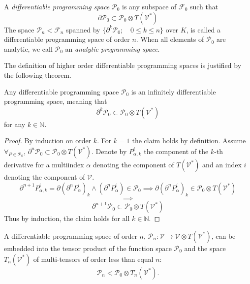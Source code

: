 \documentclass[11pt]{article}
\newcommand{\VV}{\mathcal{V}}
\newcommand{\F}{\mathcal{F}}
\newcommand{\dP}{\mathcal{P}}
\newcommand{\D}{\partial}
\begin{document}
 
 \begin{definition}\label{def:dP}
 	A \emph{differentiable programming space} $\dP_0$ is any subspace of $\F_0$ such that
 	\begin{equation}\label{eq:P}
 	\D\dP_0\subset\dP_0\otimes T(\VV^*)
\end{equation}
The space $\dP_n<\F_n$ spanned by $\{\D^k\dP_0;\quad 0\le k\le n\}$ over $K$, is
called a differentiable programming space of order $n$. When all elements of
$\dP_0$ are analytic, we call $\dP_0$ an \emph{analytic programming space}. 
 \end{definition}
The definition of higher order differentiable programming spaces is justified by the following theorem. 
\begin{theorem}\label{izr:P}
	Any differentiable programming space $\dP_0$ is an
  infinitely differentiable programming space, meaning that
	\begin{equation}\label{eq:P_n}
	 		\D^k\dP_0\subset\dP_0\otimes T(\VV^*)
	 	\end{equation}
for any $k\in\mathbb{N}$.
\end{theorem}
\begin{proof} By induction on order $k$. For $k=1$ the claim holds by definition. Assume	$\forall_{P\in\dP_0}$,
  $\D^n\dP_0\subset\dP_0\otimes T(\VV^*)$. Denote by $P_{\alpha,k}^i$ the
  component of the $k$-th derivative for a multiindex $\alpha$  denoting the
  component of $T(\VV^*)$ and an index $i$ denoting the component of $\VV$.
	\begin{equation}\label{eq:inductionStep}
\D^{n+1}P_{\alpha,k}^i=\D(\D^n P^i_\alpha)_k\land(\D^n P^i_\alpha)\in\dP_0\implies \D(\D^n P^i_\alpha)_k\in \dP_0\otimes T(\VV^*)
	\end{equation}
	$$\implies$$
	$$\D^{n+1}\dP_0\subset\dP_0\otimes T(\VV^*)$$
Thus by induction, the claim holds for all $k\in \mathbb{N}$. 
\end{proof}



 \begin{corollary}\label{izr:P_n}
 	A differentiable programming space of order $n$, $\dP_n:\VV\to \VV\otimes
  T(\VV^*)$, can be embedded into the tensor 
  product of the function space $\dP_0$ and the space $T_n(\VV^*)$ of
  multi-tensors of order less than equal $n$:
  \begin{equation}
    \label{eq:D_p_embed}
    \dP_n<\dP_0\otimes T_n(\VV^*).
  \end{equation}
 \end{corollary}
 
\end{document}
